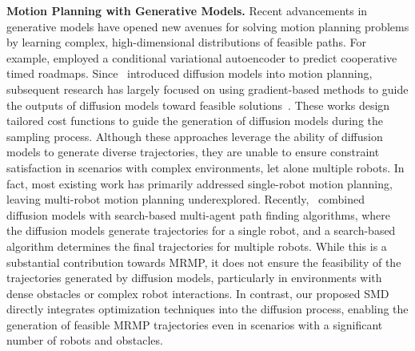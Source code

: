 \textbf{Motion Planning with Generative Models.}
Recent advancements in generative models have opened new avenues for solving motion planning problems by learning complex, high-dimensional distributions of feasible paths. For example, \citet{okumura2022ctrms} employed a conditional variational autoencoder to predict cooperative timed roadmaps. Since~\citet{janner2022planning} introduced diffusion models into motion planning, subsequent research has largely focused on using gradient-based methods to guide the outputs of diffusion models toward feasible solutions~\cite{carvalho2023motion,luo2024potential,10610519,ubukata2024diffusion,carvalho2024motion}. These works design tailored cost functions to guide the generation of diffusion models during the sampling process. Although these approaches leverage the ability of diffusion models to generate diverse trajectories, they are unable to ensure constraint satisfaction in scenarios with complex environments, let alone multiple robots. 
In fact, most existing work has primarily addressed single-robot motion planning, leaving multi-robot motion planning underexplored. Recently,~\citet{shaoul2024multi} combined diffusion models with search-based multi-agent path finding algorithms, where the diffusion models generate trajectories for a single robot, and a search-based algorithm determines the final trajectories for multiple robots. While this is a substantial contribution towards MRMP, it does not ensure the feasibility of the trajectories generated by diffusion models, particularly in environments with dense obstacles or complex robot interactions. 
In contrast, our proposed SMD directly integrates optimization techniques into the diffusion process, enabling the generation of feasible MRMP trajectories even in scenarios with a significant number of robots and obstacles.